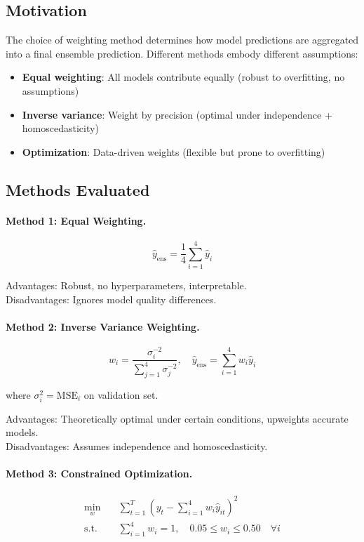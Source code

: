 \subsection{Motivation}

The choice of weighting method determines how model predictions are aggregated into a final ensemble prediction. Different methods embody different assumptions:
\begin{itemize}
  \item \textbf{Equal weighting}: All models contribute equally (robust to overfitting, no assumptions)
  \item \textbf{Inverse variance}: Weight by precision (optimal under independence + homoscedasticity)
  \item \textbf{Optimization}: Data-driven weights (flexible but prone to overfitting)
\end{itemize}

\subsection{Methods Evaluated}

\paragraph{Method 1: Equal Weighting.}
\begin{equation}
  \hat{y}_{\text{ens}} = \frac{1}{4} \sum_{i=1}^{4} \hat{y}_i
\end{equation}

Advantages: Robust, no hyperparameters, interpretable. \\
Disadvantages: Ignores model quality differences.

\paragraph{Method 2: Inverse Variance Weighting.}
\begin{equation}
  w_i = \frac{\sigma_i^{-2}}{\sum_{j=1}^{4} \sigma_j^{-2}}, \quad \hat{y}_{\text{ens}} = \sum_{i=1}^{4} w_i \hat{y}_i
\end{equation}

where $\sigma_i^2 = \text{MSE}_i$ on validation set.

Advantages: Theoretically optimal under certain conditions, upweights accurate models. \\
Disadvantages: Assumes independence and homoscedasticity.

\paragraph{Method 3: Constrained Optimization.}
\begin{align}
  \min_{w} \quad & \sum_{t=1}^{T} \left(y_t - \sum_{i=1}^{4} w_i \hat{y}_{it}\right)^2 \\
  \text{s.t.} \quad & \sum_{i=1}^{4} w_i = 1, \quad 0.05 \le w_i \le 0.50 \quad \forall i
\end{align}

